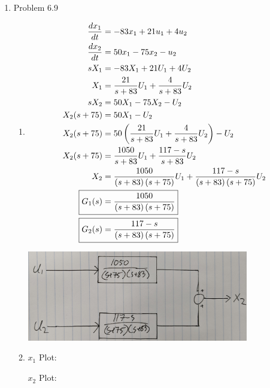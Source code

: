 \documentclass[12pt]{article}
\begin{document}
\begin{enumerate}
\begin{enumerate}
    \begin{center}
        
    \end{center}
\end{enumerate}


\newpage
\item Problem 6.9
    \begin{enumerate}
        \item 
        \begin{align*}
            \frac{dx_1}{dt} &= -83x_1 + 21u_1 + 4u_2 \\  
            \frac{dx_2}{dt} &= 50x_1 - 75x_2 - u_2 \\
            sX_1 &= -83X_1 + 21U_1 + 4U_2 \\
            X_1 &= \frac{21}{s+83} U_1 + \frac{4}{s+83} U_2 \\
            sX_2 &= 50X_1 - 75X_2 - U_2 \\
            X_2 (s+75) &= 50X_1 - U_2 \\
            X_2 (s+75) &= 50\left(\frac{21}{s+83} U_1 + \frac{4}{s+83} U_2\right) - U_2 \\
            X_2 (s+75) &= \frac{1050}{s+83} U_1 + \frac{117-s}{s+83} U_2 \\
            X_2 &= \frac{1050}{\left(s+83\right)\left(s+75\right)} U_1 + \frac{117-s}{\left(s+83\right)\left(s+75\right)} U_2 \\
            \Aboxed{G_1(s) &= \frac{1050}{\left(s+83\right)\left(s+75\right)}} \\
            \Aboxed{G_2(s) &= \frac{117-s}{\left(s+83\right)\left(s+75\right)}}
        \end{align*}

        \begin{center}
            \includegraphics[width=0.8\textwidth]{assets/block_diagram.jpg}
        \end{center}
        \item 
        
        $x_1$ Plot:

        

        $x_2$ Plot:
        
        
    \end{enumerate}


\end{enumerate}
\end{document}
